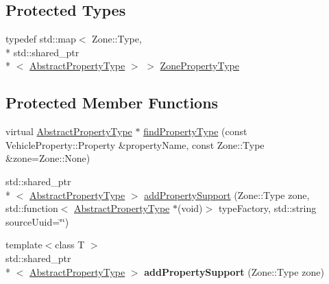 \subsection*{Protected Types}
\begin{DoxyCompactItemize}
\item 
typedef std\+::map$<$ Zone\+::\+Type, \\*
std\+::shared\+\_\+ptr\\*
$<$ \hyperlink{classAbstractPropertyType}{Abstract\+Property\+Type} $>$ $>$ \hyperlink{classAmbPluginImpl_a6be3e5823bb358932c132760262fb4ee}{Zone\+Property\+Type}
\end{DoxyCompactItemize}
\subsection*{Protected Member Functions}
\begin{DoxyCompactItemize}
\item 
virtual \hyperlink{classAbstractPropertyType}{Abstract\+Property\+Type} $\ast$ \hyperlink{classAmbPluginImpl_a885512c1be862693f6e6a10c70a23ab2}{find\+Property\+Type} (const Vehicle\+Property\+::\+Property \&property\+Name, const Zone\+::\+Type \&zone=Zone\+::\+None)
\item 
std\+::shared\+\_\+ptr\\*
$<$ \hyperlink{classAbstractPropertyType}{Abstract\+Property\+Type} $>$ \hyperlink{classAmbPluginImpl_a96567c4d044e98821fec46ace002b8ed}{add\+Property\+Support} (Zone\+::\+Type zone, std\+::function$<$ \hyperlink{classAbstractPropertyType}{Abstract\+Property\+Type} $\ast$(void)$>$ type\+Factory, std\+::string source\+Uuid=\char`\"{}\char`\"{})
\item 
\hypertarget{classAmbPluginImpl_aad251db3a4cb7f188c2853a273bccef1}{{\footnotesize template$<$class T $>$ }\\std\+::shared\+\_\+ptr\\*
$<$ \hyperlink{classAbstractPropertyType}{Abstract\+Property\+Type} $>$ {\bfseries add\+Property\+Support} (Zone\+::\+Type zone)}\label{classAmbPluginImpl_aad251db3a4cb7f188c2853a273bccef1}

\end{DoxyCompactItemize}
